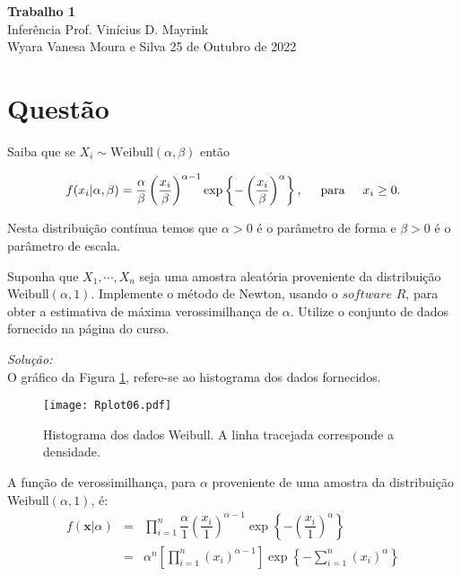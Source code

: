 \documentclass[a4paper, 11pt]{article}
\begin{document}
\noindent
{\Large\textbf{Trabalho 1} \hfill \\
Inferência \hfill Prof. Vinícius D. Mayrink \\
Wyara Vanesa Moura e Silva \hfill 25 de Outubro de 2022\\}

\section*{Questão}

Saiba que se $X_{i} \sim \mbox{Weibull}(\alpha, \beta)$ então

\begin{equation*}
f(x_{i}|\alpha, \beta) = \dfrac{\alpha}{\beta}\left(\dfrac{x_{i}}{\beta}\right)^{\alpha -1}\exp\left\{-\left(\dfrac{x_{i}}{\beta}\right)^{\alpha}\right\}, \hspace{0.5cm} \mbox{para} \hspace{0.5cm} x_{i}\geq 0.
\end{equation*}

Nesta distribuição contínua temos que $\alpha>0$ é o parâmetro de forma e $\beta>0$ é o parâmetro de escala.

Suponha que $X_{1}, \cdots, X_{n}$ seja uma amostra aleatória proveniente da distribuição Weibull$(\alpha,1)$. Implemente o método de Newton, usando o $software$ $R$, para obter a estimativa de máxima verossimilhança de $\alpha$. Utilize o conjunto de dados fornecido na página do curso.

\vspace{2ex}
\noindent
\textit{Solução:}\\

O gráfico da Figura \ref{fig1}, refere-se ao histograma dos dados fornecidos.

\begin{figure}[H]
\centering
\texttt{[image: Rplot06.pdf]}
\caption{Histograma dos dados Weibull. A linha tracejada corresponde a densidade.}
\label{fig1}
\end{figure}

A função de verossimilhança, para $\alpha$ proveniente de uma amostra da distribuição Weibull$(\alpha,1)$, é:
\begin{equation*}
\begin{array}{lclll}
f(\textbf{x}|\alpha) & = & \displaystyle\prod_{i=1}^{n} \dfrac{\alpha}{1}\left(\dfrac{x_{i}}{1}\right)^{\alpha -1}\exp\left\{-\left(\dfrac{x_{i}}{1}\right)^{\alpha}\right\} \\
& = & \alpha^{n}\left[\displaystyle\prod_{i=1}^{n}\left(x_{i}\right)^{\alpha -1}\right]\exp\left\{-\displaystyle\sum_{i=1}^{n}\left(x_{i}\right)^{\alpha}\right\}  \\[10pt] 
\end{array}
\end{equation*}
\end{document}
